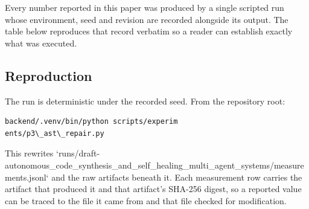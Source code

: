 \documentclass[10pt,twocolumn,letterpaper]{article}
\begin{document}
Every number reported in this paper was produced by a single scripted run whose environment, seed and revision are recorded alongside its output. The table below reproduces that record verbatim so a reader can establish exactly what was executed.
\begin{table}[htbp]
\centering
{}
\end{table}


\subsection{Reproduction}


The run is deterministic under the recorded seed. From the repository root:


\begin{scriptsize}
\begin{verbatim}
backend/.venv/bin/python scripts/experim
ents/p3\_ast\_repair.py
\end{verbatim}
\end{scriptsize}


This rewrites `runs/draft-autonomous\_code\_synthesis\_and\_self\_healing\_multi\_agent\_systems/measurements.jsonl` and the raw artifacts beneath it. Each measurement row carries the artifact that produced it and that artifact's SHA-256 digest, so a reported value can be traced to the file it came from and that file checked for modification.
\end{document}
